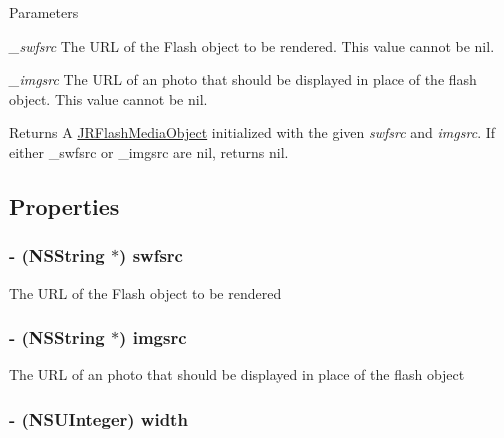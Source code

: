 \begin{DoxyParams}{Parameters}
\item[{\em \_\-swfsrc}]The URL of the Flash object to be rendered. This value cannot be {\ttfamily nil}.\item[{\em \_\-imgsrc}]The URL of an photo that should be displayed in place of the flash object. This value cannot be {\ttfamily nil}.\end{DoxyParams}
\begin{DoxyReturn}{Returns}
A {\ttfamily \hyperlink{interface_j_r_flash_media_object}{JRFlashMediaObject}} initialized with the given {\itshape swfsrc\/} and {\itshape imgsrc\/}. If either {\ttfamily \_\-swfsrc} or {\ttfamily \_\-imgsrc} are nil, returns {\ttfamily nil}. 
\end{DoxyReturn}


\subsection{Properties}
\hypertarget{interface_j_r_flash_media_object_a5a79b3d8071ac0286b3ee60e9e0138d0}{
\subsubsection[{swfsrc}]{\setlength{\rightskip}{0pt plus 5cm}-\/ (NSString $\ast$) swfsrc}}
\label{interface_j_r_flash_media_object_a5a79b3d8071ac0286b3ee60e9e0138d0}
The URL of the Flash object to be rendered \hypertarget{interface_j_r_flash_media_object_a5a26cacd216012b37900445a8161ac56}{
\subsubsection[{imgsrc}]{\setlength{\rightskip}{0pt plus 5cm}-\/ (NSString $\ast$) imgsrc}}
\label{interface_j_r_flash_media_object_a5a26cacd216012b37900445a8161ac56}
The URL of an photo that should be displayed in place of the flash object \hypertarget{interface_j_r_flash_media_object_aaeb77e697438b7aa6e44f52bea0ed9c2}{
\subsubsection[{width}]{\setlength{\rightskip}{0pt plus 5cm}-\/ (NSUInteger) width}}
